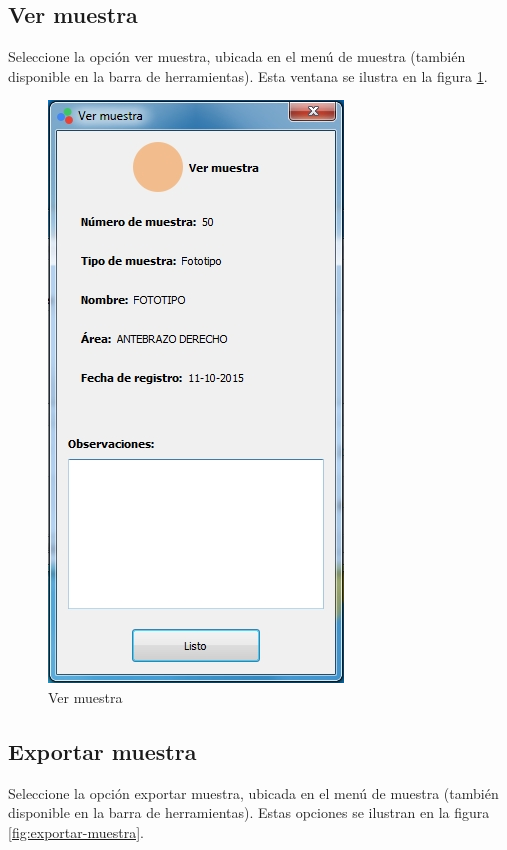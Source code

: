 	\subsection*{Ver muestra}
	
	Seleccione la opci\'{o}n ver muestra, ubicada en el men\'{u} de muestra (tambi\'{e}n disponible en la barra de herramientas). Esta ventana se ilustra en la figura \ref{fig:ver-muestra}.
	
\begin{figure}[H]
  \centering
  \includegraphics[width=.5\linewidth]{./img/ver-muestra.jpg}
\caption[]{Ver muestra\label{fig:ver-muestra}}
\end{figure}
\newpage
	\subsection*{Exportar muestra}
	
	Seleccione la opci\'{o}n exportar muestra, ubicada en el men\'{u} de muestra (tambi\'{e}n disponible en la barra de herramientas). Estas opciones se ilustran en la figura \ref{fig:exportar-muestra}.
	
